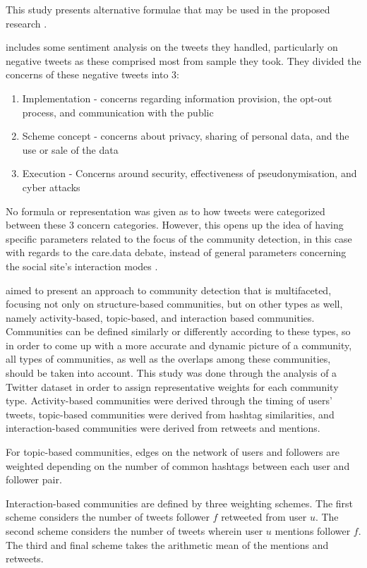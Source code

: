This study presents alternative formulae that may be used in the proposed research \cite{Bakillah:2014}.

 includes some sentiment analysis on the tweets they handled, particularly on negative tweets as these comprised most from sample they took. They divided the concerns of these negative tweets into 3:

\begin{enumerate}
	\item Implementation - concerns regarding information provision, the opt-out process, and communication with the public
	\item Scheme concept - concerns about privacy, sharing of personal data, and the use or sale of the data
	\item Execution - Concerns around security, effectiveness of pseudonymisation, and cyber attacks
	
\end{enumerate}

No formula or representation was given as to how tweets were categorized between these 3 concern categories. However, this opens up the idea of having specific parameters related to the focus of the community detection, in this case with regards to the care.data debate, instead of general parameters concerning the social site’s interaction modes \cite{Amor:2015}.

 aimed to present an approach to community detection that is multifaceted, focusing not only on structure-based communities, but on other types as well, namely activity-based, topic-based, and interaction based communities. Communities can be defined similarly or differently according to these types, so in order to come up with a more accurate and dynamic picture of a community, all types of communities, as well as the overlaps among these communities, should be taken into account. This study was done through the analysis of a Twitter dataset in order to assign representative weights for each community type. Activity-based communities were derived through the timing of users' tweets, topic-based communities were derived from hashtag similarities, and interaction-based communities were derived from retweets and mentions.

For topic-based communities, edges on the network of users and followers are weighted depending on the number of common hashtags between each user and follower pair. 

Interaction-based communities are defined by three weighting schemes. The first scheme considers the number of tweets follower $f$ retweeted from user $u$. The second scheme considers the number of tweets wherein user $u$ mentions follower $f$. The third and final scheme takes the arithmetic mean of the mentions and retweets.

